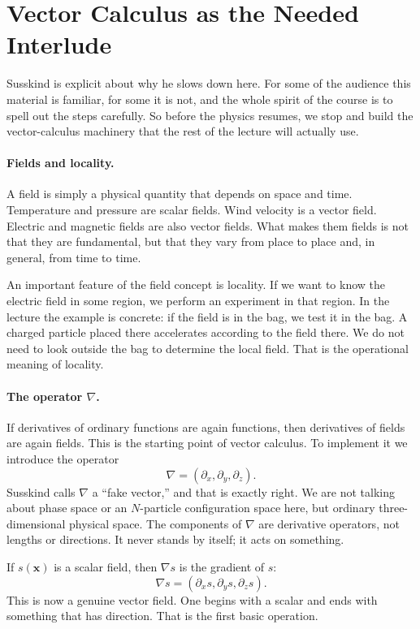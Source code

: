 \section{Vector Calculus as the Needed Interlude}

Susskind is explicit about why he slows down here. For some of the audience this material is familiar, for some it is not, and the whole spirit of the course is to spell out the steps carefully. So before the physics resumes, we stop and build the vector-calculus machinery that the rest of the lecture will actually use.

\paragraph{Fields and locality.}
A field is simply a physical quantity that depends on space and time. Temperature and pressure are scalar fields. Wind velocity is a vector field. Electric and magnetic fields are also vector fields. What makes them fields is not that they are fundamental, but that they vary from place to place and, in general, from time to time.

An important feature of the field concept is locality. If we want to know the electric field in some region, we perform an experiment in that region. In the lecture the example is concrete: if the field is in the bag, we test it in the bag. A charged particle placed there accelerates according to the field there. We do not need to look outside the bag to determine the local field. That is the operational meaning of locality.

\paragraph{The operator \(\nabla\).}
If derivatives of ordinary functions are again functions, then derivatives of fields are again fields. This is the starting point of vector calculus. To implement it we introduce the operator
\begin{equation}
\nabla=(\partial_x,\partial_y,\partial_z).
\end{equation}
Susskind calls \(\nabla\) a ``fake vector,'' and that is exactly right. We are not talking about phase space or an \(N\)-particle configuration space here, but ordinary three-dimensional physical space. The components of \(\nabla\) are derivative operators, not lengths or directions. It never stands by itself; it acts on something.

If \(s(\mathbf x)\) is a scalar field, then \(\nabla s\) is the gradient of \(s\):
\begin{equation}
\nabla s=(\partial_x s,\partial_y s,\partial_z s).
\end{equation}
This is now a genuine vector field. One begins with a scalar and ends with something that has direction. That is the first basic operation.

